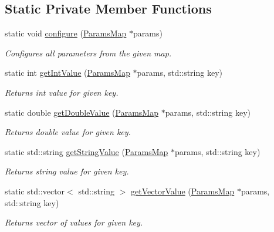 \subsection*{Static Private Member Functions}
\begin{DoxyCompactItemize}
\item 
static void \hyperlink{classSigma_ae36d3796eca2942917a455e689b1cf22}{configure} (\hyperlink{sigma_8h_a731115adbc0862ff6c28d129591ab640}{ParamsMap} $\ast$params)
\begin{DoxyCompactList}\small\item\em Configures all parameters from the given map. \item\end{DoxyCompactList}\item 
static int \hyperlink{classSigma_af1496b16a68d1d49110d70be6309845a}{getIntValue} (\hyperlink{sigma_8h_a731115adbc0862ff6c28d129591ab640}{ParamsMap} $\ast$params, std::string key)
\begin{DoxyCompactList}\small\item\em Returns int value for given key. \item\end{DoxyCompactList}\item 
static double \hyperlink{classSigma_a4d8f139e0451335bb43af4b451b3e969}{getDoubleValue} (\hyperlink{sigma_8h_a731115adbc0862ff6c28d129591ab640}{ParamsMap} $\ast$params, std::string key)
\begin{DoxyCompactList}\small\item\em Returns double value for given key. \item\end{DoxyCompactList}\item 
static std::string \hyperlink{classSigma_acd4df3477ab84afa7fb7572c9bf5b4df}{getStringValue} (\hyperlink{sigma_8h_a731115adbc0862ff6c28d129591ab640}{ParamsMap} $\ast$params, std::string key)
\begin{DoxyCompactList}\small\item\em Returns string value for given key. \item\end{DoxyCompactList}\item 
static std::vector$<$ std::string $>$ \hyperlink{classSigma_ab02fc1243a8a4bd0e462d81f27d348c8}{getVectorValue} (\hyperlink{sigma_8h_a731115adbc0862ff6c28d129591ab640}{ParamsMap} $\ast$params, std::string key)
\begin{DoxyCompactList}\small\item\em Returns vector of values for given key. \item\end{DoxyCompactList}\end{DoxyCompactItemize}


